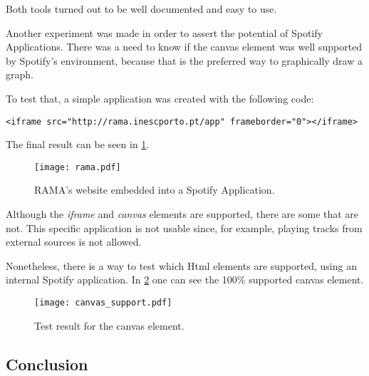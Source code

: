     Both tools turned out to be well documented and easy to use.


    Another experiment was made in order to assert the potential of Spotify Applications.
    There was a need to know if the canvas element was well supported by Spotify's environment, because that is the preferred way to graphically draw a graph.

    To test that, a simple application was created with the following code:

    \begin{lstlisting}[caption={\emph{iframe} element that allows to embed RAMA's website into the application.}]
      <iframe src="http://rama.inescporto.pt/app" frameborder="0"></iframe>\end{lstlisting}

    The final result can be seen in \ref{fig:rama_spotifyed}.

    \begin{figure}
      \begin{center}
        \texttt{[image: rama.pdf]}
      \end{center}
      \caption{RAMA's website embedded into a Spotify Application.}
      \label{fig:rama_spotifyed}
    \end{figure}

    Although the \emph{iframe} and \emph{canvas} elements are supported, there are some that are not.
    This specific application is not usable since, for example, playing tracks from external sources is not allowed.

    Nonetheless, there is a way to test which Html elements are supported, using an internal Spotify application.
    In \ref{fig:canvas_support} one can see the 100\% supported canvas element.

    \begin{figure}
       \begin{center}
         \texttt{[image: canvas\_support.pdf]}
       \end{center}
       \caption{Test result for the canvas element.}
       \label{fig:canvas_support}
     \end{figure}


  \subsection{Conclusion} %
  \label{sub:conclusion}

